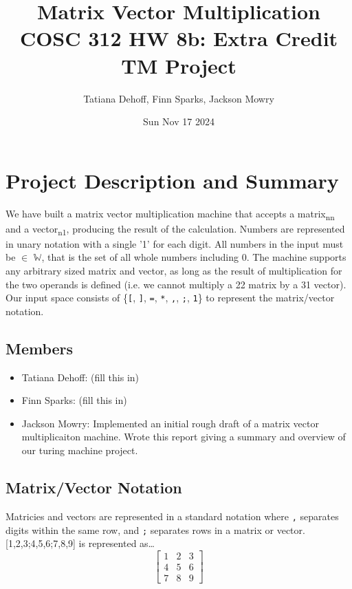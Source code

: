\documentclass[letterpaper, 11pt]{article}
\author{Tatiana Dehoff, Finn Sparks, Jackson Mowry}
\date{Sun Nov 17 2024}
\title{Matrix Vector Multiplication\\\medskip
\large COSC 312 HW 8b: Extra Credit TM Project}
\begin{document}
\maketitle
\section{Project Description and Summary}
\label{sec:org35877a1}
We have built a matrix vector multiplication machine that accepts a matrix\textsubscript{n\texttimes{}n} and a vector\textsubscript{n\texttimes{}1}, producing the result of the calculation. Numbers are represented in unary notation with a single '1' for each digit. All numbers in the input must be \(\in\) \(\mathbb{W}\), that is the set of all whole numbers including 0. The machine supports any arbitrary sized matrix and vector, as long as the result of multiplication for the two operands is defined (i.e. we cannot multiply a 2\texttimes{}2 matrix by a 3\texttimes{}1 vector).\\

Our input space consists of \{\texttt{[}, \texttt{]}, \texttt{=}, \texttt{*}, \texttt{,}, \texttt{;}, \texttt{1}\} to represent the matrix/vector notation.\\
\subsection{Members}
\label{sec:org62a3e63}
\begin{itemize}
\item Tatiana Dehoff: (fill this in)\\
\item Finn Sparks: (fill this in)\\
\item Jackson Mowry: Implemented an initial rough draft of a matrix vector multiplicaiton machine. Wrote this report giving a summary and overview of our turing machine project.\\
\end{itemize}
\subsection{Matrix/Vector Notation}
\label{sec:org9ec4c6c}
Matricies and vectors are represented in a standard notation where \texttt{,} separates digits within the same row, and \texttt{;} separates rows in a matrix or vector. [1,2,3;4,5,6;7,8,9] is represented as\ldots{}\\
\[\begin{bmatrix}1&2&3\\4&5&6\\7&8&9\end{bmatrix}\]\\
\end{document}
